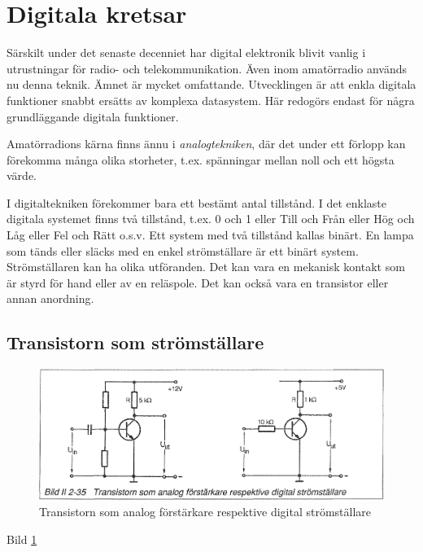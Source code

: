 \section{Digitala kretsar}

Särskilt under det senaste decenniet har digital elektronik blivit vanlig i
utrustningar för radio- och telekommunikation. Även inom amatörradio används nu
denna teknik. Ämnet är mycket omfattande. Utvecklingen är att enkla digitala
funktioner snabbt ersätts av komplexa datasystem. Här redogörs endast för några
grundläggande digitala funktioner.

Amatörradions kärna finns ännu i \emph{analogtekniken}, där det under ett
förlopp kan förekomma många olika storheter, t.ex. spänningar mellan noll och
ett högsta värde.

I digitaltekniken förekommer bara ett bestämt antal tillstånd. I det enklaste
digitala systemet finns två tillstånd, t.ex. 0 och 1 eller Till och Från eller
Hög och Låg eller Fel och Rätt o.s.v. Ett system med två tillstånd kallas
binärt. En lampa som tänds eller släcks med en enkel strömställare är ett binärt
system. Strömställaren kan ha olika utföranden. Det kan vara en mekanisk kontakt
som är styrd för hand eller av en reläspole. Det kan också vara en transistor
eller annan anordning.

\subsection{Transistorn som strömställare}

\begin{figure}[h]
\begin{center}
\includegraphics[width=14cm]{images/bild_2_2-35}
\caption{Transistorn som analog förstärkare respektive digital strömställare}
\label{fig:BildII2-35}
\end{center}
\end{figure}

Bild \ref{fig:BildII2-35}

